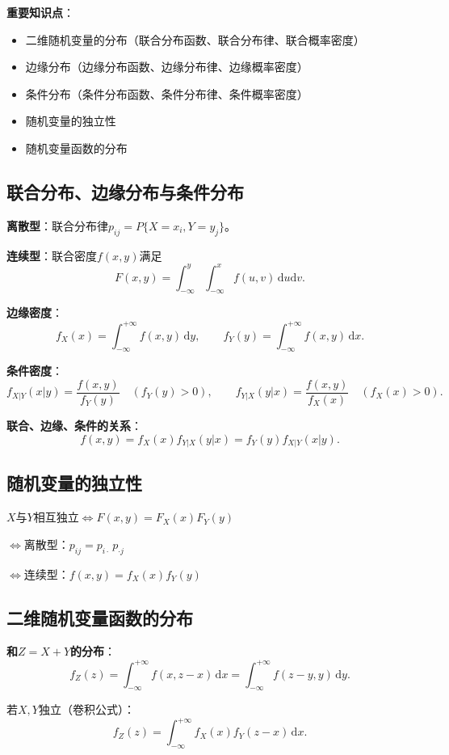 \documentclass[11pt,a4paper]{report}
\theoremstyle{definition}
\theoremstyle{plain}
\begin{document}
\textbf{重要知识点}：
\begin{itemize}[leftmargin=2em]
    \item 二维随机变量的分布（联合分布函数、联合分布律、联合概率密度）
    \item 边缘分布（边缘分布函数、边缘分布律、边缘概率密度）
    \item 条件分布（条件分布函数、条件分布律、条件概率密度）
    \item 随机变量的独立性
    \item 随机变量函数的分布
\end{itemize}

\subsection{联合分布、边缘分布与条件分布}

\textbf{离散型}：联合分布律$p_{ij}=P\{X=x_i,Y=y_j\}$。

\textbf{连续型}：联合密度$f(x,y)$满足
\[
F(x,y)=\int_{-\infty}^{y}\int_{-\infty}^{x}f(u,v)\,\mathrm{d}u\mathrm{d}v.
\]

\textbf{边缘密度}：
\[
f_X(x)=\int_{-\infty}^{+\infty}f(x,y)\,\mathrm{d}y,\qquad
f_Y(y)=\int_{-\infty}^{+\infty}f(x,y)\,\mathrm{d}x.
\]

\textbf{条件密度}：
\[
f_{X|Y}(x|y)=\frac{f(x,y)}{f_Y(y)}\quad(f_Y(y)>0),\qquad
f_{Y|X}(y|x)=\frac{f(x,y)}{f_X(x)}\quad(f_X(x)>0).
\]

\textbf{联合、边缘、条件的关系}：
\[
f(x,y)=f_X(x)f_{Y|X}(y|x)=f_Y(y)f_{X|Y}(x|y).
\]

\subsection{随机变量的独立性}

$X$与$Y$相互独立$\iff F(x,y)=F_X(x)F_Y(y)$

$\iff$离散型：$p_{ij}=p_{i\cdot}\,p_{\cdot j}$

$\iff$连续型：$f(x,y)=f_X(x)f_Y(y)$

\subsection{二维随机变量函数的分布}

\textbf{和$Z=X+Y$的分布}：
\[
f_Z(z)=\int_{-\infty}^{+\infty}f(x,z-x)\,\mathrm{d}x
=\int_{-\infty}^{+\infty}f(z-y,y)\,\mathrm{d}y.
\]

若$X,Y$独立（卷积公式）：
\[
f_Z(z)=\int_{-\infty}^{+\infty}f_X(x)f_Y(z-x)\,\mathrm{d}x.
\]
\end{document}
